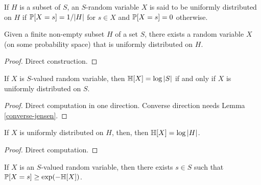 \begin{definition}\label{uniform-def}\leanok
   If $H$ is a subset of $S$, an $S$-random variable $X$ is said to be uniformly distributed on $H$ if $\mathbb{P}[X = s] = 1/|H|$ for $s \in X$ and $\mathbb{P}[X=s] = 0$ otherwise.
\end{definition}

\begin{lemma}\label{unif-exist}
  \leanok
  Given a finite non-empty subset $H$ of a set $S$, there exists a random variable $X$ (on some probability space) that is uniformly distributed on $H$.
\end{lemma}

\begin{proof} Direct construction.
\end{proof}


\begin{lemma}\label{uniform-entropy}
  \leanok
  If $X$ is $S$-valued random variable, then $\mathbb{H}[X] = \log |S|$ if and only if $X$ is uniformly distributed on $S$.
\end{lemma}

\begin{proof} \leanok Direct computation in one direction.  Converse direction needs Lemma \ref{converse-jensen}.
\end{proof}

\begin{lemma}\label{uniform-entropy-II}
  \leanok
  If $X$ is uniformly distributed on $H$, then, then $\mathbb{H}[X] = \log |H|$.
\end{lemma}

\begin{proof} Direct computation.
\end{proof}

\begin{lemma}\label{bound-conc}
  \leanok
  If $X$ is an $S$-valued random variable, then there exists $s \in S$ such that $\mathbb{P}[X=s] \geq \exp(-\mathbb{H}[X])$.
\end{lemma}

